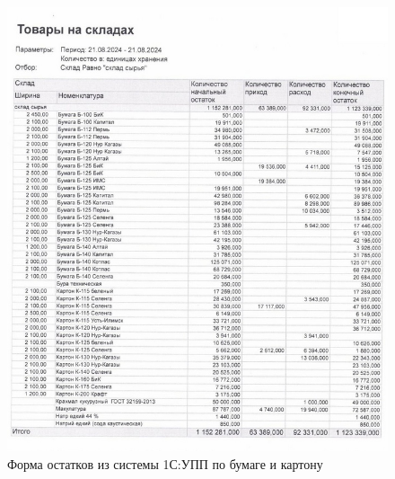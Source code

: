 \begin{figure}
\begin{center}
  \includegraphics[height=0.8\textheight, keepaspectratio]{Pics/d36.jpg}
\end{center}
  \caption{Форма остатков из системы 1С:УПП по бумаге и картону}
  \label{pic:d36}
\end{figure}
\clearpage

